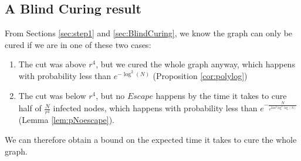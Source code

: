\subsection{A Blind Curing result}
From Sections \ref{sec:step1} and \ref{sec:BlindCuring}, we know the graph can only be cured if we are in one of these two cases:
\begin{enumerate}
	\item The cut was above $r^4$, but we cured the whole graph anyway, which happens with probability less than $e^{-\log^2(N)}$ (Proposition \ref{cor:polylog})
	\item The cut was below $r^4$, but no $Escape$ happens by the time it takes to cure half of $\frac{N}{r^4}$ infected nodes, which happens with probability less than $e^{-\frac{N}{e^{24\alpha^2\log^2\log(N)}}}$ (Lemma \ref{lem:pNoescape}). 
\end{enumerate}

We can therefore obtain a bound on the expected time it takes to cure the whole graph.

